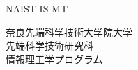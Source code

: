 \renewcommand\thepage{Title1}
\thispagestyle{empty}
{\raggedleft
  \normalsize NAIST-IS-MT\studentnumber \\
}
\vspace*{9truemm}
\begin{center}
 \Large\bfseries\jdoctitle
\end{center}
\vspace*{27truemm}
\begin{center}
 \Large\bfseries\jtitle
\end{center}
\vspace*{18truemm}
\begin{center}
 \Large\jauthor
\end{center}
\vspace*{50truemm}
\begin{center}
 \jdate
\end{center}
\vspace*{4.5truemm}
\begin{center}
 奈良先端科学技術大学院大学 \\
 先端科学技術研究科 \\
 情報理工学プログラム
\end{center}
\vspace*{\fill}
